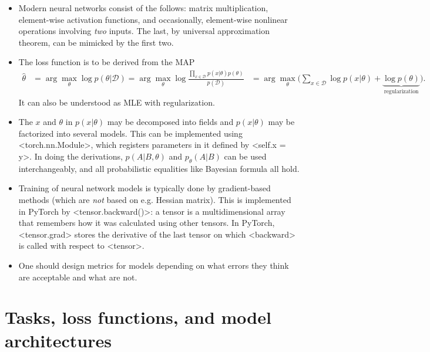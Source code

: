 \documentclass[hyperref, a4paper, 12pt]{report}
\newcommand*{\argmax}{\arg\max}
\def\\{}%
\def\texttt#1{<#1>}%
\newcommand{\shortcode}[1]{\texttt{#1}}
\begin{document}
\begin{itemize}
    \item Modern neural networks consist of the follows: matrix multiplication, element-wise activation functions, and occasionally, element-wise nonlinear operations involving \emph{two} inputs.
    The last, by universal approximation theorem, can be mimicked by the first two.

    \item The loss function is to be derived from the MAP 
    \begin{equation}
        \begin{aligned}
            \hat{\theta} &= \argmax_\theta \log p(\theta | \mathcal{D}) = \argmax_\theta \log \frac{\prod_{x \in \mathcal{D}} p(x | \theta) p(\theta)}{p(\mathcal{D})} \\
            &= \argmax_\theta \big(
                \sum_{x \in \mathcal{D}} \log p(x | \theta) + \underbrace{\log p(\theta)}_{\text{regularization}}
            \big).
        \end{aligned}
    \end{equation}
    It can also be understood as MLE with regularization.

    \item The $x$ and $\theta$ in $p(x | \theta)$ may be decomposed into fields and $p(x | \theta)$ may be factorized into several models.
    This can be implemented using \shortcode{torch.nn.Module},
    which registers parameters in it defined by \shortcode{self.x = y}.
    In doing the derivations, $p(A | B, \theta)$ and $p_\theta(A | B)$ can be used interchangeably,
    and all probabilistic equalities like Bayesian formula all hold.

    \item Training of neural network models is typically done by gradient-based methods
    (which are \emph{not} based on e.g. Hessian matrix).
    This is implemented in PyTorch by \shortcode{tensor.backward()}:
    a tensor is a multidimensional array that remembers how it was calculated using other tensors.
    In PyTorch, \shortcode{tensor.grad} stores the derivative of the last tensor on which \shortcode{backward} is called with respect to \shortcode{tensor}.
    
    \item One should design metrics for models depending on what errors they think are acceptable and what are not.
\end{itemize}

\chapter{Tasks, loss functions, and model architectures}\label{chap:loss}
\end{document}

